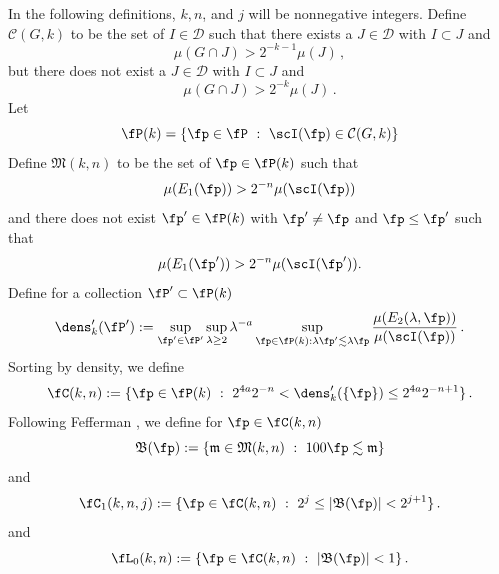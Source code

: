 In the following definitions, $k, n$, and
$j$ will be nonnegative integers.
Define
$\mathcal{C}(G,k)$ to be the set of $I\in \mathcal{D}$
such that there exists a $J\in \mathcal{D}$ with $I\subset J$
and
\begin{equation}\label{muhj1}
   {\mu(G \cap J)} > 2^{-k-1}{\mu(J)}\, ,
\end{equation}
but there does not exist a $J\in \mathcal{D}$ with $I\subset J$ and
\begin{equation}\label{muhj2}
   {\mu(G \cap J)} > 2^{-k}{\mu(J)}\,.
\end{equation}
Let
\begin{equation}
    \label{eq-defPk}
    \fP(k)=\{\fp\in \fP \ : \ \scI(\fp)\in \mathcal{C}(G,k)\}
\end{equation}
Define $ {\mathfrak{M}}(k,n)$ to be the set of $\fp \in \fP(k)$ such that
 \begin{equation}\label{ebardense}
    \mu({E_1}(\fp)) > 2^{-n} \mu(\scI(\fp))
 \end{equation}
and there does not exist $\fp'\in \fP(k)$ with
$\fp'\neq \fp$ and $\fp\le \fp'$ such that
 \begin{equation}\label{mnkmax}
    \mu({E_1}(\fp')) > 2^{-n} \mu(\scI(\fp')).
 \end{equation}
Define for a collection $\fP'\subset \fP(k)$
\begin{equation}
    \label{eq-densdef}
   \dens_k' (\fP'):= \sup_{\fp'\in \fP'}\sup_{\lambda \geq 2} \lambda^{-a} \sup_{\fp \in \fP(k): \lambda \fp' \lesssim \lambda \fp}
    \frac{\mu({E}_2(\lambda, \fp))}{\mu(\scI(\fp))}\,.
\end{equation}
Sorting by density, we define
\begin{equation}
    \label{def-cnk}
    \fC(k,n):=\{\fp\in \fP(k) \ : \
    2^{4a}2^{-n}< \dens_k'(\{\fp\}) \le
    2^{4a}2^{-n+1}\}\,.
\end{equation}
Following Fefferman \cite{fefferman}, we
define for $\fp \in \fC(k,n)$
\begin{equation}\label{defbfp}
     \mathfrak{B}(\fp) := \{ \mathfrak{m} \in \mathfrak{M}(k,n) \ : \ 100 \fp \lesssim \mathfrak{m}\}
\end{equation}
and
\begin{equation}\label{defcnkj}
       \fC_1(k,n,j) := \{\fp \in \fC(k,n) \ : \ 2^{j} \leq |\mathfrak{B}(\fp)| < 2^{j+1}\}\,.
\end{equation}
and
\begin{equation}\label{defl0nk}
       \fL_0(k,n) := \{\fp \in \fC(k,n) \ : \ |\mathfrak{B}(\fp)| <1\}\,.
\end{equation}
